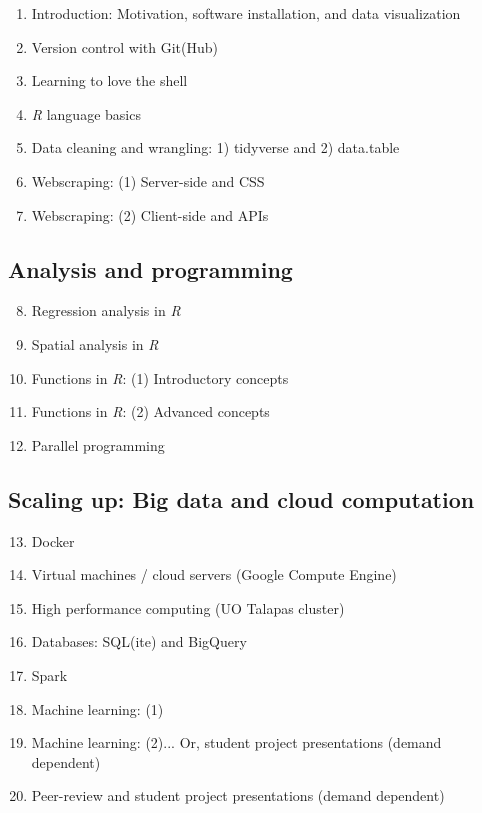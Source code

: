 \documentclass[12]{article}
\begin{document}
\begin{enumerate}
	\item Introduction: Motivation, software installation, and data visualization
	\item Version control with Git(Hub)
	\item Learning to love the shell
	\item \textit{R} language basics
	\item Data cleaning and wrangling: 1) tidyverse and 2) data.table
	\item Webscraping: (1) Server-side and CSS
	\item Webscraping: (2) Client-side and APIs
\end{enumerate}

\subsection*{Analysis and programming}

\begin{enumerate}
	\setcounter{enumi}{7}
	\item Regression analysis in \textit{R}
	\item Spatial analysis in \textit{R}
	\item Functions in \textit{R}: (1) Introductory concepts
	\item Functions in \textit{R}: (2) Advanced concepts
	\item Parallel programming
\end{enumerate}

\subsection*{Scaling up: Big data and cloud computation}

\begin{enumerate}
	\setcounter{enumi}{12}
	\item Docker
	\item Virtual machines / cloud servers (Google Compute Engine)
	\item High performance computing (UO Talapas cluster) 
	\item Databases: SQL(ite) and BigQuery
	\item Spark
	\item Machine learning: (1)
	\item Machine learning: (2)... Or, student project presentations (demand dependent)
	\item Peer-review and student project presentations (demand dependent)
\end{enumerate}
\end{document}
